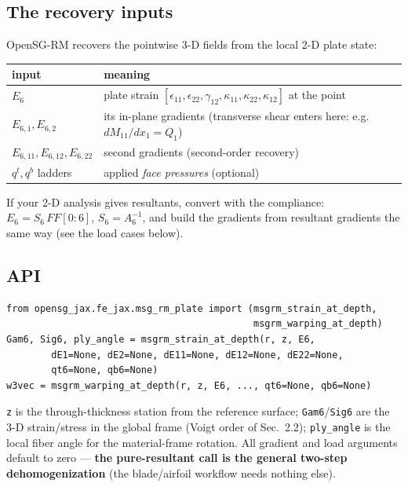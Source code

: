 \documentclass[11pt]{article}
\newcommand{\code}[1]{\texttt{#1}}
\begin{document}
\subsection{The recovery inputs}
OpenSG-RM recovers the pointwise 3-D fields from the local 2-D plate
state:
\begin{center}
\begin{tabular}{lp{11.2cm}}
\toprule
input & meaning \\
\midrule
$E_6$ & plate strain $[\epsilon_{11},\epsilon_{22},\gamma_{12},
        \kappa_{11},\kappa_{22},\kappa_{12}]$ at the point \\
$E_{6,1},E_{6,2}$ & its in-plane gradients (transverse shear enters here:
        e.g.\ $dM_{11}/dx_1=Q_1$) \\
$E_{6,11},E_{6,12},E_{6,22}$ & second gradients (second-order recovery) \\
$q^{t},q^{b}$ ladders & applied \emph{face pressures} (optional) \\
\bottomrule
\end{tabular}
\end{center}
If your 2-D analysis gives resultants, convert with the compliance:
$E_6 = S_6\,F\!F[0{:}6]$, $S_6=A_6^{-1}$, and build the gradients from
resultant gradients the same way (see the load cases below).

\subsection{API}
\begin{verbatim}
from opensg_jax.fe_jax.msg_rm_plate import (msgrm_strain_at_depth,
                                            msgrm_warping_at_depth)
Gam6, Sig6, ply_angle = msgrm_strain_at_depth(r, z, E6,
        dE1=None, dE2=None, dE11=None, dE12=None, dE22=None,
        qt6=None, qb6=None)
w3vec = msgrm_warping_at_depth(r, z, E6, ..., qt6=None, qb6=None)
\end{verbatim}
\code{z} is the through-thickness station from the reference surface;
\code{Gam6}/\code{Sig6} are the 3-D strain/stress in the global frame
(Voigt order of Sec.~2.2); \code{ply\_angle} is the local fiber angle
for the material-frame rotation.  All gradient and load arguments
default to zero --- \textbf{the pure-resultant call is the general
two-step dehomogenization} (the blade/airfoil workflow needs nothing
else).
\end{document}
